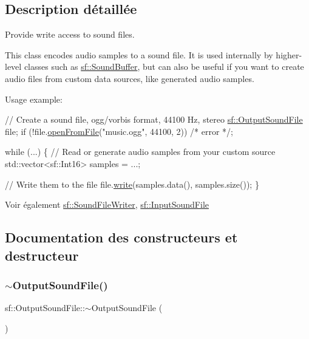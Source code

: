 \subsection{Description détaillée}
Provide write access to sound files. 

This class encodes audio samples to a sound file. It is used internally by higher-\/level classes such as \hyperlink{classsf_1_1SoundBuffer}{sf\+::\+Sound\+Buffer}, but can also be useful if you want to create audio files from custom data sources, like generated audio samples.

Usage example\+: 
\begin{DoxyCode}
\textcolor{comment}{// Create a sound file, ogg/vorbis format, 44100 Hz, stereo}
\hyperlink{classsf_1_1OutputSoundFile}{sf::OutputSoundFile} file;
\textcolor{keywordflow}{if} (!file.\hyperlink{classsf_1_1OutputSoundFile_ae5e55f01c53c1422c44eaed2eed67fce}{openFromFile}(\textcolor{stringliteral}{"music.ogg"}, 44100, 2))
    \textcolor{comment}{/* error */};

\textcolor{keywordflow}{while} (...)
\{
    \textcolor{comment}{// Read or generate audio samples from your custom source}
    std::vector<sf::Int16> samples = ...;

    \textcolor{comment}{// Write them to the file}
    file.\hyperlink{classsf_1_1OutputSoundFile_adfcf525fced71121f336fa89faac3d67}{write}(samples.data(), samples.size());
\}
\end{DoxyCode}


\begin{DoxySeeAlso}{Voir également}
\hyperlink{classsf_1_1SoundFileWriter}{sf\+::\+Sound\+File\+Writer}, \hyperlink{classsf_1_1InputSoundFile}{sf\+::\+Input\+Sound\+File} 
\end{DoxySeeAlso}


\subsection{Documentation des constructeurs et destructeur}
\mbox{\label{classsf_1_1OutputSoundFile_a1492adbfef1f391d720afb56f068182e}} 
\subsubsection{\texorpdfstring{$\sim$\+Output\+Sound\+File()}{~OutputSoundFile()}}
{\footnotesize\ttfamily sf\+::\+Output\+Sound\+File\+::$\sim$\+Output\+Sound\+File (\begin{DoxyParamCaption}{ }\end{DoxyParamCaption})}



